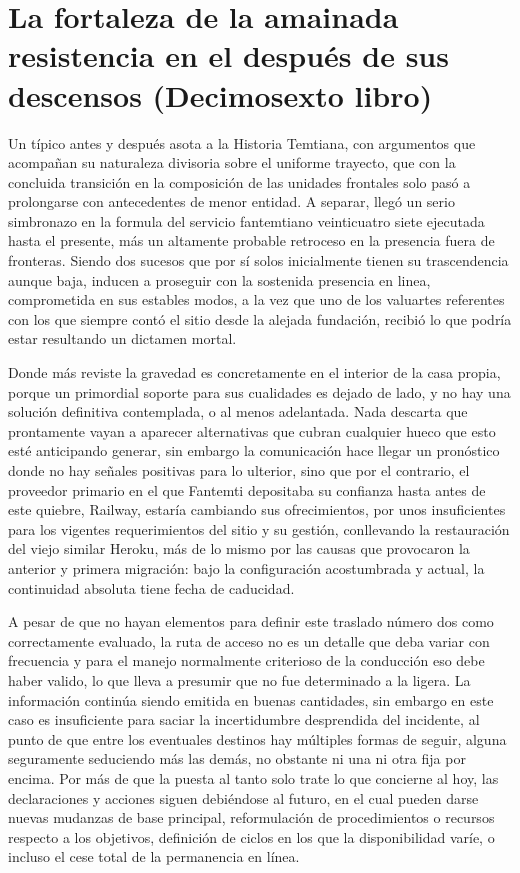 \documentclass[
]{book}
\begin{document}
\hypertarget{la-fortaleza-de-la-amainada-resistencia-en-el-despuuxe9s-de-sus-descensos-decimosexto-libro}{%
\chapter{La fortaleza de la amainada resistencia en el después de sus descensos (Decimosexto libro)}\label{la-fortaleza-de-la-amainada-resistencia-en-el-despuuxe9s-de-sus-descensos-decimosexto-libro}}

Un típico antes y después asota a la Historia Temtiana, con argumentos que acompañan su naturaleza divisoria sobre el uniforme trayecto, que con la concluida transición en la composición de las unidades frontales solo pasó a prolongarse con antecedentes de menor entidad. A separar, llegó un serio simbronazo en la formula del servicio fantemtiano veinticuatro siete ejecutada hasta el presente, más un altamente probable retroceso en la presencia fuera de fronteras. Siendo dos sucesos que por sí solos inicialmente tienen su trascendencia aunque baja, inducen a proseguir con la sostenida presencia en linea, comprometida en sus estables modos, a la vez que uno de los valuartes referentes con los que siempre contó el sitio desde la alejada fundación, recibió lo que podría estar resultando un dictamen mortal.

Donde más reviste la gravedad es concretamente en el interior de la casa propia, porque un primordial soporte para sus cualidades es dejado de lado, y no hay una solución definitiva contemplada, o al menos adelantada. Nada descarta que prontamente vayan a aparecer alternativas que cubran cualquier hueco que esto esté anticipando generar, sin embargo la comunicación hace llegar un pronóstico donde no hay señales positivas para lo ulterior, sino que por el contrario, el proveedor primario en el que Fantemti depositaba su confianza hasta antes de este quiebre, Railway, estaría cambiando sus ofrecimientos, por unos insuficientes para los vigentes requerimientos del sitio y su gestión, conllevando la restauración del viejo similar Heroku, más de lo mismo por las causas que provocaron la anterior y primera migración: bajo la configuración acostumbrada y actual, la continuidad absoluta tiene fecha de caducidad.

A pesar de que no hayan elementos para definir este traslado número dos como correctamente evaluado, la ruta de acceso no es un detalle que deba variar con frecuencia y para el manejo normalmente criterioso de la conducción eso debe haber valido, lo que lleva a presumir que no fue determinado a la ligera. La información continúa siendo emitida en buenas cantidades, sin embargo en este caso es insuficiente para saciar la incertidumbre desprendida del incidente, al punto de que entre los eventuales destinos hay múltiples formas de seguir, alguna seguramente seduciendo más las demás, no obstante ni una ni otra fija por encima. Por más de que la puesta al tanto solo trate lo que concierne al hoy, las declaraciones y acciones siguen debiéndose al futuro, en el cual pueden darse nuevas mudanzas de base principal, reformulación de procedimientos o recursos respecto a los objetivos, definición de ciclos en los que la disponibilidad varíe, o incluso el cese total de la permanencia en línea.
\end{document}
